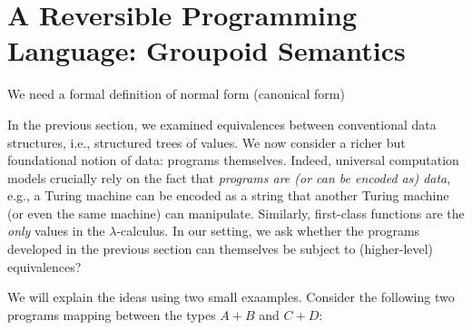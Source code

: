 \section{A Reversible Programming Language: Groupoid Semantics}
\label{sec:reversibletwo}
\label{langeqeq}

We need a formal definition of normal form (canonical form)

In the previous section, we examined equivalences between conventional data structures, i.e., structured trees of
values. We now consider a richer but foundational notion of data: programs themselves. Indeed, universal computation
models crucially rely on the fact that \emph{programs are (or can be encoded as) data}, e.g., a Turing machine can be
encoded as a string that another Turing machine (or even the same machine) can manipulate. Similarly, first-class
functions are the \emph{only} values in the $\lambda$-calculus.  In our setting, we ask whether the programs developed
in the previous section can themselves be subject to (higher-level) equivalences?

We will explain the ideas using two small exaamples. Consider the following two programs mapping between the types
$A + B$ and $C+D$:

